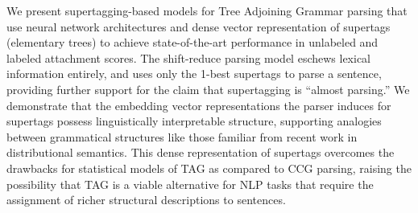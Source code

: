 We present supertagging-based models for Tree Adjoining Grammar parsing that use neural network architectures and dense vector representation of supertags (elementary trees) to achieve state-of-the-art performance in unlabeled and labeled attachment scores. The shift-reduce parsing model eschews lexical information entirely, and uses only the 1-best supertags to parse a sentence, providing further support for the claim that supertagging is ``almost parsing.'' We demonstrate that the embedding vector representations the parser induces for supertags possess linguistically interpretable structure, supporting analogies between grammatical structures like those familiar from recent work in distributional semantics. This dense representation of supertags overcomes the drawbacks for statistical models of TAG as compared to CCG parsing, raising the possibility that TAG is a viable alternative for NLP tasks that require the assignment of richer structural descriptions to sentences.
